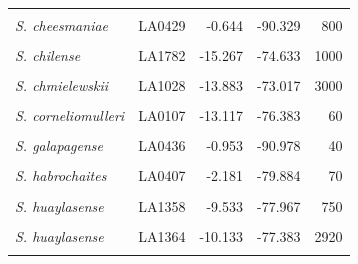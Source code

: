 \documentclass[
  letterpaper,
  DIV=11,
  numbers=noendperiod]{scrartcl}
\begin{document}
\begin{longtable}{>{\raggedright\arraybackslash}p{3.25cm}lrrr}
\endfoot
\bottomrule
\endlastfoot
\em{\cellcolor{gray!10}{S. arcanum}} & \cellcolor{gray!10}{LA2172} & \cellcolor{gray!10}{-6.008} & \cellcolor{gray!10}{-78.858} & \cellcolor{gray!10}{662}\\
\em{S. cheesmaniae} & LA0429 & -0.644 & -90.329 & 800\\
\em{\cellcolor{gray!10}{S. cheesmaniae}} & \cellcolor{gray!10}{LA3124} & \cellcolor{gray!10}{-0.804} & \cellcolor{gray!10}{-90.042} & \cellcolor{gray!10}{1}\\
\em{S. chilense} & LA1782 & -15.267 & -74.633 & 1000\\
\em{\cellcolor{gray!10}{S. chilense}} & \cellcolor{gray!10}{LA4117A} & \cellcolor{gray!10}{-22.907} & \cellcolor{gray!10}{-67.941} & \cellcolor{gray!10}{3540}\\
\addlinespace
\em{S. chmielewskii} & LA1028 & -13.883 & -73.017 & 3000\\
\em{\cellcolor{gray!10}{S. chmielewskii}} & \cellcolor{gray!10}{LA1316} & \cellcolor{gray!10}{-13.400} & \cellcolor{gray!10}{-73.906} & \cellcolor{gray!10}{2920}\\
\em{S. corneliomulleri} & LA0107 & -13.117 & -76.383 & 60\\
\em{\cellcolor{gray!10}{S. corneliomulleri}} & \cellcolor{gray!10}{LA0444} & \cellcolor{gray!10}{-13.433} & \cellcolor{gray!10}{-76.133} & \cellcolor{gray!10}{100}\\
\em{S. galapagense} & LA0436 & -0.953 & -90.978 & 40\\
\addlinespace
\em{\cellcolor{gray!10}{S. galapagense}} & \cellcolor{gray!10}{LA1044} & \cellcolor{gray!10}{-0.284} & \cellcolor{gray!10}{-90.548} & \cellcolor{gray!10}{0}\\
\em{S. habrochaites} & LA0407 & -2.181 & -79.884 & 70\\
\em{\cellcolor{gray!10}{S. habrochaites}} & \cellcolor{gray!10}{LA1777} & \cellcolor{gray!10}{-9.550} & \cellcolor{gray!10}{-77.700} & \cellcolor{gray!10}{3216}\\
\em{S. huaylasense} & LA1358 & -9.533 & -77.967 & 750\\
\em{\cellcolor{gray!10}{S. huaylasense}} & \cellcolor{gray!10}{LA1360} & \cellcolor{gray!10}{-9.546} & \cellcolor{gray!10}{-77.929} & \cellcolor{gray!10}{1490}\\
\addlinespace
\em{S. huaylasense} & LA1364 & -10.133 & -77.383 & 2920\\
\em{\cellcolor{gray!10}{S. lycopersicoides}} & \cellcolor{gray!10}{LA2951} & \cellcolor{gray!10}{-19.317} & \cellcolor{gray!10}{-69.450} & \cellcolor{gray!10}{2200}\\

\end{longtable}
\end{document}
